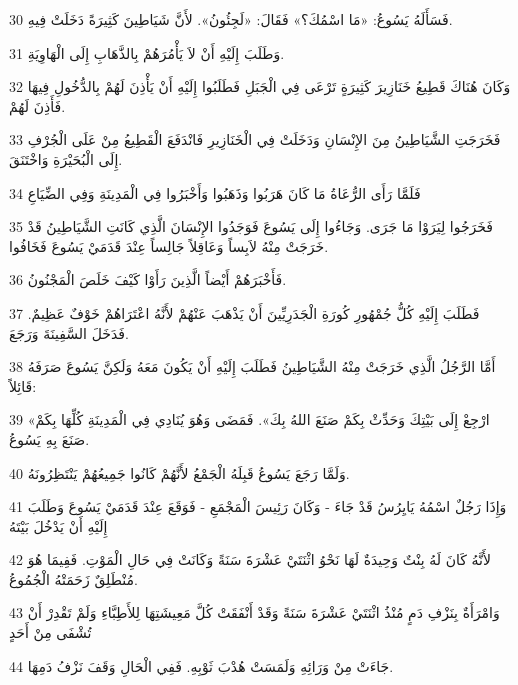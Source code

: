 \par 30 فَسَأَلَهُ يَسُوعُ: «مَا اسْمُكَ؟» فَقَالَ: «لَجِئُونُ». لأَنَّ شَيَاطِينَ كَثِيرَةً دَخَلَتْ فِيهِ.
\par 31 وَطَلَبَ إِلَيْهِ أَنْ لاَ يَأْمُرَهُمْ بِالذَّهَابِ إِلَى الْهَاوِيَةِ.
\par 32 وَكَانَ هُنَاكَ قَطِيعُ خَنَازِيرَ كَثِيرَةٍ تَرْعَى فِي الْجَبَلِ فَطَلَبُوا إِلَيْهِ أَنْ يَأْذِنَ لَهُمْ بِالدُّخُولِ فِيهَا فَأَذِنَ لَهُمْ.
\par 33 فَخَرَجَتِ الشَّيَاطِينُ مِنَ الإِنْسَانِ وَدَخَلَتْ فِي الْخَنَازِيرِ فَانْدَفَعَ الْقَطِيعُ مِنْ عَلَى الْجُرْفِ إِلَى الْبُحَيْرَةِ وَاخْتَنَقَ.
\par 34 فَلَمَّا رَأَى الرُّعَاةُ مَا كَانَ هَرَبُوا وَذَهَبُوا وَأَخْبَرُوا فِي الْمَدِينَةِ وَفِي الضِّيَاعِ
\par 35 فَخَرَجُوا لِيَرَوْا مَا جَرَى. وَجَاءُوا إِلَى يَسُوعَ فَوَجَدُوا الإِنْسَانَ الَّذِي كَانَتِ الشَّيَاطِينُ قَدْ خَرَجَتْ مِنْهُ لاَبِساً وَعَاقِلاً جَالِساً عِنْدَ قَدَمَيْ يَسُوعَ فَخَافُوا.
\par 36 فَأَخْبَرَهُمْ أَيْضاً الَّذِينَ رَأَوْا كَيْفَ خَلَصَ الْمَجْنُونُ.
\par 37 فَطَلَبَ إِلَيْهِ كُلُّ جُمْهُورِ كُورَةِ الْجَدَرِيِّينَ أَنْ يَذْهَبَ عَنْهُمْ لأَنَّهُ اعْتَرَاهُمْ خَوْفٌ عَظِيمٌ. فَدَخَلَ السَّفِينَةَ وَرَجَعَ.
\par 38 أَمَّا الرَّجُلُ الَّذِي خَرَجَتْ مِنْهُ الشَّيَاطِينُ فَطَلَبَ إِلَيْهِ أَنْ يَكُونَ مَعَهُ وَلَكِنَّ يَسُوعَ صَرَفَهُ قَائِلاً:
\par 39 «ارْجِعْ إِلَى بَيْتِكَ وَحَدِّثْ بِكَمْ صَنَعَ اللهُ بِكَ». فَمَضَى وَهُوَ يُنَادِي فِي الْمَدِينَةِ كُلِّهَا بِكَمْ صَنَعَ بِهِ يَسُوعُ.
\par 40 وَلَمَّا رَجَعَ يَسُوعُ قَبِلَهُ الْجَمْعُ لأَنَّهُمْ كَانُوا جَمِيعُهُمْ يَنْتَظِرُونَهُ.
\par 41 وَإِذَا رَجُلٌ اسْمُهُ يَايِرُسُ قَدْ جَاءَ - وَكَانَ رَئِيسَ الْمَجْمَعِ - فَوَقَعَ عِنْدَ قَدَمَيْ يَسُوعَ وَطَلَبَ إِلَيْهِ أَنْ يَدْخُلَ بَيْتَهُ
\par 42 لأَنَّهُ كَانَ لَهُ بِنْتٌ وَحِيدَةٌ لَهَا نَحْوُ اثْنَتَيْ عَشْرَةَ سَنَةً وَكَانَتْ فِي حَالِ الْمَوْتِ. فَفِيمَا هُوَ مُنْطَلِقٌ زَحَمَتْهُ الْجُمُوعُ.
\par 43 وَامْرَأَةٌ بِنَزْفِ دَمٍ مُنْذُ اثْنَتَيْ عَشْرَةَ سَنَةً وَقَدْ أَنْفَقَتْ كُلَّ مَعِيشَتِهَا لِلأَطِبَّاءِ وَلَمْ تَقْدِرْ أَنْ تُشْفَى مِنْ أَحَدٍ
\par 44 جَاءَتْ مِنْ وَرَائِهِ وَلَمَسَتْ هُدْبَ ثَوْبِهِ. فَفِي الْحَالِ وَقَفَ نَزْفُ دَمِهَا.
